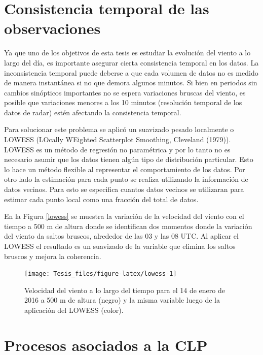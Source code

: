 \documentclass[12pt,spanish,oneside]{book}
\begin{document}
\section{Consistencia temporal de las
observaciones}\label{consistencia-temporal-de-las-observaciones}

Ya que uno de los objetivos de esta tesis es estudiar la evolución del
viento a lo largo del día, es importante asegurar cierta consistencia
temporal en los datos. La inconsistencia temporal puede deberse a que
cada volumen de datos no es medido de manera instantánea si no que
demora algunos minutos. Si bien en periodos sin cambios sinópticos
importantes no se espera variaciones bruscas del viento, es posible que
variaciones menores a los 10 minutos (resolución temporal de los datos
de radar) estén afectando la consistencia temporal.

Para solucionar este problema se aplicó un suavizado pesado localmente o
LOWESS (LOcally WEighted Scatterplot Smoothing, Cleveland (1979)).
LOWESS es un método de regresión no paramétrica y por lo tanto no es
necesario asumir que los datos tienen algún tipo de distribución
particular. Esto lo hace un método flexible al representar el
comportamiento de los datos. Por otro lado la estimación para cada punto
se realiza utilizando la información de datos vecinos. Para esto se
especifica cuantos datos vecinos se utilizaran para estimar cada punto
local como una fracción del total de datos.

En la Figura \ref{lowess} se muestra la variación de la velocidad del
viento con el tiempo a 500 m de altura donde se identifican dos momentos
donde la variación del viento da saltos bruscos, alrededor de las 03 y
las 08 UTC. Al aplicar el LOWESS el resultado es un suavizado de la
variable que elimina los saltos bruscos y mejora la coherencia.

\begin{figure}

{\centering \texttt{[image: Tesis\_files/figure-latex/lowess-1]} 

}

\caption{Velocidad del viento a lo largo del tiempo para el 14 de enero de 2016 a 500 m de altura (negro) y la misma variable luego de la aplicación del LOWESS (color). \label{lowess}}\label{fig:lowess}
\end{figure}

\section{Procesos asociados a la CLP}\label{procesos-asociados-a-la-clp}
\end{document}
